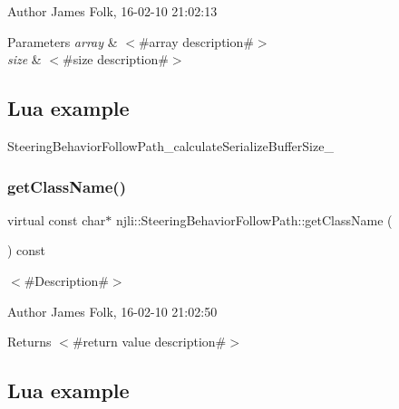 \begin{DoxyAuthor}{Author}
James Folk, 16-\/02-\/10 21\+:02\+:13
\end{DoxyAuthor}

\begin{DoxyParams}{Parameters}
{\em array} & $<$\#array description\#$>$ \\
\hline
{\em size} & $<$\#size description\#$>$\\
\hline
\end{DoxyParams}
\hypertarget{classnjli_1_1_steering_behavior_wander_ex1}{}\subsection{Lua example}\label{classnjli_1_1_steering_behavior_wander_ex1}

\begin{DoxyCodeInclude}
\end{DoxyCodeInclude}
Steering\+Behavior\+Follow\+Path\+\_\+calculate\+Serialize\+Buffer\+Size\+\_\+ \mbox{\label{classnjli_1_1_steering_behavior_follow_path_a6281efac5e2e10796806c739692cd00b}} 
\subsubsection{\texorpdfstring{get\+Class\+Name()}{getClassName()}}
{\footnotesize\ttfamily virtual const char$\ast$ njli\+::\+Steering\+Behavior\+Follow\+Path\+::get\+Class\+Name (\begin{DoxyParamCaption}{ }\end{DoxyParamCaption}) const\hspace{0.3cm}{\ttfamily [virtual]}}



$<$\#\+Description\#$>$ 

\begin{DoxyAuthor}{Author}
James Folk, 16-\/02-\/10 21\+:02\+:50
\end{DoxyAuthor}
\begin{DoxyReturn}{Returns}
$<$\#return value description\#$>$
\end{DoxyReturn}
\hypertarget{classnjli_1_1_steering_behavior_wander_ex1}{}\subsection{Lua example}\label{classnjli_1_1_steering_behavior_wander_ex1}

